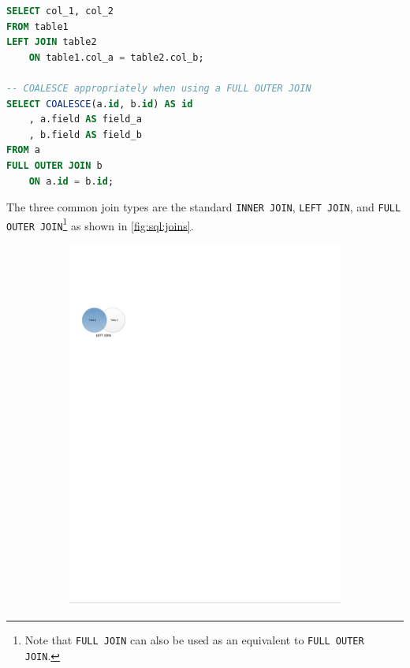\begin{lstlisting}[language=SQL]
SELECT col_1, col_2
FROM table1
LEFT JOIN table2
	ON table1.col_a = table2.col_b;

-- COALESCE appropriately when using a FULL OUTER JOIN
SELECT COALESCE(a.id, b.id) AS id
	, a.field AS field_a
	, b.field AS field_b
FROM a
FULL OUTER JOIN b
	ON a.id = b.id;
\end{lstlisting}

The three common join types are the standard
\texttt{INNER JOIN}, \texttt{LEFT JOIN},
and \texttt{FULL OUTER JOIN}\footnote{Note that
\texttt{FULL JOIN} can also be used as an equivalent to \texttt{FULL OUTER JOIN}.} as
shown in \cref{fig:sql:joins}.

\begin{figure}[H]
\centering
  \begin{subfigure}[c]{0.3\textwidth}\centering
  \includegraphics[width=\textwidth]{figures/sql/left_join}
  \label{fig:sql:joins:left_join}

\end{subfigure}
\end{figure}
